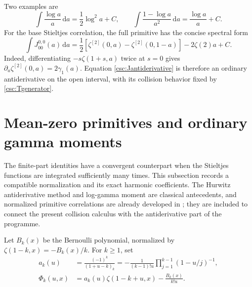 \documentclass[11pt,a4paper]{article}
\numberwithin{equation}{section}
\theoremstyle{definition}
\begin{document}
Two examples are
\[
\int\frac{\log a}{a}\,\mathrm da=\frac12\log^2a+C,
\qquad
\int\frac{1-\log a}{a^2}\,\mathrm da=\frac{\log a}{a}+C.
\]
For the base Stieltjes correlation, the full primitive has the concise spectral form
\begin{equation}\label{csc:Jantiderivative}
\int J_{00}^{0,0}(a)\,\mathrm da
=\frac12\left[\zeta^{[2]}(0,a)-\zeta^{[2]}(0,1-a)\right]-2\zeta(2)a+C.
\end{equation}
Indeed, differentiating $-s\zeta(1+s,a)$ twice at $s=0$ gives
$\partial_a\zeta^{[2]}(0,a)=2\gamma_1(a)$. Equation \eqref{csc:Jantiderivative} is therefore an ordinary antiderivative on the open interval, with its collision behavior fixed by \eqref{csc:Tgenerator}.

\section{Mean-zero primitives and ordinary gamma moments}\label{csc:primitives}
The finite-part identities have a convergent counterpart when the Stieltjes functions are integrated sufficiently many times. This subsection records a compatible normalization and its exact harmonic coefficients. The Hurwitz antiderivative method and log-gamma moment are classical antecedents, and normalized primitive correlations are already developed in \cite{csc:shifted}; they are included to connect the present collision calculus with the antiderivative part of the programme.

Let $B_k(x)$ be the Bernoulli polynomial, normalized by
$\zeta(1-k,x)=-B_k(x)/k$. For $k\ge1$, set
\begin{align}
a_k(u)&=\frac{(-1)^k}{(1+u-k)_k}
=-\frac1{(k-1)!u}\prod_{j=1}^{k-1}(1-u/j)^{-1},\label{csc:ak}\\
\Phi_k(u,x)&=a_k(u)\zeta(1-k+u,x)-\frac{B_k(x)}{k!u}.\label{csc:Phi}
\end{align}
\end{document}
